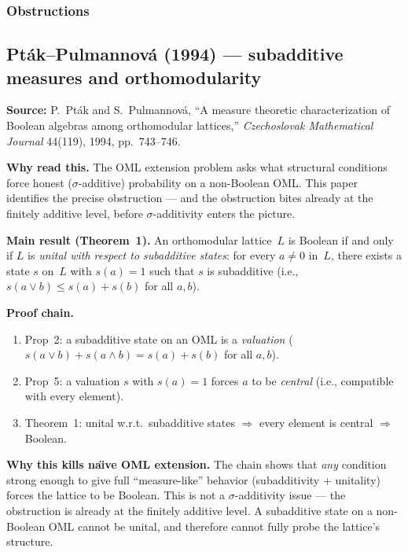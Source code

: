 \subsubsection{Obstructions}

\subsection*{Pt\'{a}k--Pulmannov\'{a} (1994) --- subadditive measures
and orthomodularity}

\textbf{Source:} P.\ Pt\'{a}k and S.\ Pulmannov\'{a}, ``A measure
theoretic characterization of Boolean algebras among orthomodular
lattices,'' \emph{Czechoslovak Mathematical Journal} 44(119), 1994,
pp.~743--746.

\textbf{Why read this.}  The OML extension problem asks what structural
conditions force honest ($\sigma$-additive) probability on a
non-Boolean OML\@.  This paper identifies the precise obstruction ---
and the obstruction bites already at the finitely additive level, before
$\sigma$-additivity enters the picture.

\textbf{Main result (Theorem~1).}  An orthomodular lattice~$L$ is
Boolean if and only if $L$ is \emph{unital with respect to subadditive
states}: for every $a \neq 0$ in~$L$, there exists a state $s$ on~$L$
with $s(a) = 1$ such that $s$ is subadditive (i.e.,
$s(a \vee b) \leq s(a) + s(b)$ for all $a, b$).

\textbf{Proof chain.}
\begin{enumerate}[nosep]
  \item Prop~2: a subadditive state on an OML is a \emph{valuation}
    ($s(a \vee b) + s(a \wedge b) = s(a) + s(b)$ for all $a,b$).
  \item Prop~5: a valuation $s$ with $s(a) = 1$ forces $a$ to be
    \emph{central} (i.e., compatible with every element).
  \item Theorem~1: unital w.r.t.\ subadditive states $\Rightarrow$
    every element is central $\Rightarrow$ Boolean.
\end{enumerate}

\textbf{Why this kills na\"{\i}ve OML extension.}  The chain shows that
\emph{any} condition strong enough to give full ``measure-like''
behavior (subadditivity + unitality) forces the lattice to be Boolean.
This is not a $\sigma$-additivity issue --- the obstruction is already
at the finitely additive level.  A subadditive state on a non-Boolean
OML cannot be unital, and therefore cannot fully probe the lattice's
structure.

